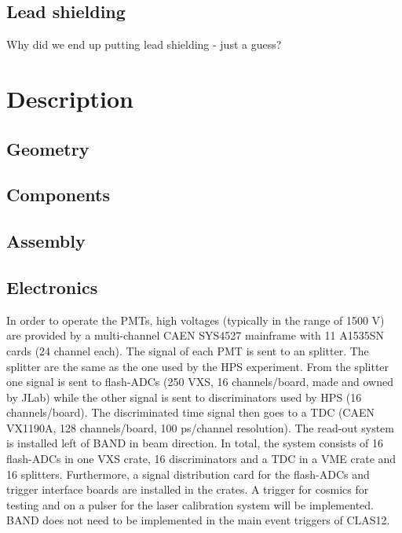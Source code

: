 \documentclass[review]{elsarticle}
\begin{document}
\subsection{Lead shielding}
{\color{red}Why did we end up putting lead shielding - just a guess?}


\section{Description}

\subsection{Geometry}

\subsection{Components}




\subsection{Assembly}

\subsection{Electronics}
In order to operate the PMTs, high voltages (typically in the range of 1500 V) are provided by a multi-channel CAEN SYS4527 mainframe with 11 A1535SN cards (24 channel each).
The signal of each PMT is sent to an splitter. The splitter are the same as the one used by the HPS experiment.
From the splitter one signal is sent to flash-ADCs (250 VXS, 16 channels/board, made and owned by JLab) while the other signal is sent to  discriminators used by HPS (16 channels/board).
The discriminated time signal then goes to a TDC (CAEN VX1190A, 128 channels/board, 100 ps/channel resolution). The read-out system is installed left of BAND in beam direction. 
In total, the system consists of 16 flash-ADCs in one VXS crate, 16 discriminators and a TDC in a VME crate and 16 splitters.  Furthermore, a signal distribution card for the flash-ADCs and trigger interface boards are installed in the crates. A trigger for cosmics for testing and on a pulser for the laser calibration system will be implemented. BAND does not need to be implemented in the main event triggers of CLAS12.
\end{document}
